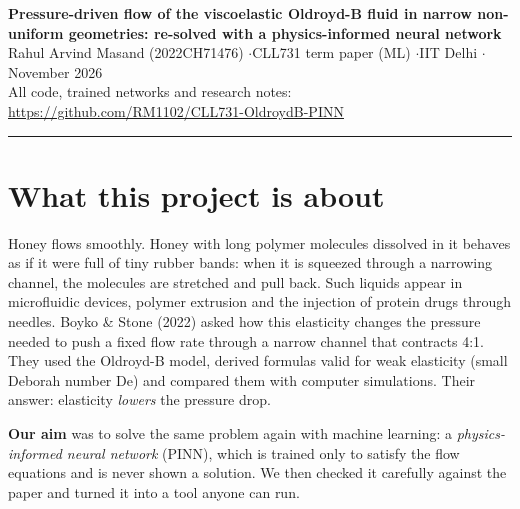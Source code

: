 \documentclass[10.5pt,a4paper]{article}
\begin{document}
\sloppy

{\large\bfseries Pressure-driven flow of the viscoelastic Oldroyd-B fluid in narrow non-uniform geometries: re-solved with a physics-informed neural network}\\[3pt]
{\small Rahul Arvind Masand (2022CH71476) \quad$\cdot$\quad CLL731 term paper (ML) \quad$\cdot$\quad IIT Delhi \quad$\cdot$\quad November 2026}\\[1pt]
{\small All code, trained networks and research notes: \url{https://github.com/RM1102/CLL731-OldroydB-PINN}}

\vspace{-2pt}\noindent\rule{\linewidth}{0.4pt}

\section{What this project is about}
Honey flows smoothly. Honey with long polymer molecules dissolved in it behaves as if it were full of tiny rubber bands: when it is squeezed through a narrowing channel, the molecules are stretched and pull back. Such liquids appear in microfluidic devices, polymer extrusion and the injection of protein drugs through needles. Boyko \& Stone (2022) asked how this elasticity changes the pressure needed to push a fixed flow rate through a narrow channel that contracts 4:1. They used the Oldroyd-B model, derived formulas valid for weak elasticity (small Deborah number De) and compared them with computer simulations. Their answer: elasticity \emph{lowers} the pressure drop.

\textbf{Our aim} was to solve the same problem again with machine learning: a \emph{physics-informed neural network} (PINN), which is trained only to satisfy the flow equations and is never shown a solution. We then checked it carefully against the paper and turned it into a tool anyone can run.
\end{document}

